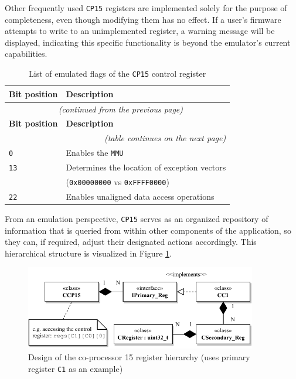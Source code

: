 \documentclass[english, ing, kiv, he, iso690numb, pdf]{fasthesis}
\begin{document}
	Other frequently used \texttt{CP15} registers are implemented solely for the purpose of completeness, even though modifying them has no effect. If a user's firmware attempts to write to an unimplemented register, a warning message will be displayed, indicating this specific functionality is beyond the emulator's current capabilities.
	
	\begin{center}
		\begin{longtable}{p{}p{}}
			\caption{List of emulated flags of the \texttt{CP15} control register}
			\label{List of emulated flags of the CP15 control register}\\
			\toprule[1.5pt]
			\textbf{Bit position} & \textbf{Description}\\
			\midrule
			\endfirsthead
			\multicolumn{2}{c}{\tablename{}~\thetable{} \textit{(continued from the previous page)}}\\
			\midrule
			\textbf{Bit position} & \textbf{Description}\\
			\midrule
			\endhead
			\midrule
			\multicolumn{2}{r}{\textit{(table continues on the next page)}}\\
			\endfoot
			\bottomrule[1.5pt]
			\endlastfoot
			\texttt{0} & Enables the \texttt{MMU}\\ 
			\texttt{13} & Determines the location of exception vectors\\ & (\texttt{0x00000000} vs \texttt{0xFFFF0000})\\ 
			\texttt{22} & Enables unaligned data access operations\\ 
		\end{longtable}
	\end{center}
	
	\newpage
	
	From an emulation perspective, \texttt{CP15} serves as an organized repository of information that is queried from within other components of the application, so they can, if required, adjust their designated actions accordingly. This hierarchical structure is visualized in Figure \ref{Design of the co-processor 15 register hierarchy}.
	
	\begin{figure}[ht]
		\centering
		\includegraphics[width=0.9\textwidth]{img/diagrams/cp15.pdf}
		\caption{Design of the co-processor 15 register hierarchy (uses primary register \texttt{C1} as an example)}
		\label{Design of the co-processor 15 register hierarchy}
	\end{figure}
	
\end{document}
